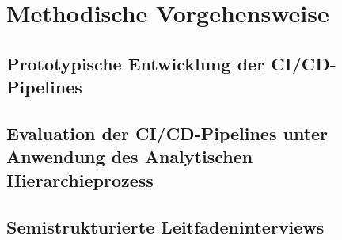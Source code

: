 \section{Methodische Vorgehensweise}

\subsection{Prototypische Entwicklung der CI/CD-Pipelines}

\subsection{Evaluation der CI/CD-Pipelines unter Anwendung des Analytischen Hierarchieprozess}

\subsection{Semistrukturierte Leitfadeninterviews}
